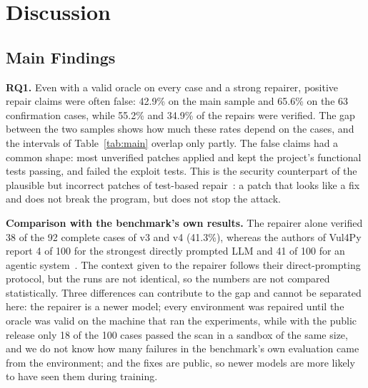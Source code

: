 \documentclass[ai,article,submit,oneauthor]{Definitions/mdpi}
\begin{document}
\section{Discussion}\label{sec:discussion}

\subsection{Main Findings}

\textbf{RQ1.} Even with a valid oracle on every case and a strong repairer, positive repair claims were often false: 42.9\% on the main sample and 65.6\% on the 63 confirmation cases, while 55.2\% and 34.9\% of the repairs were verified. The gap between the two samples shows how much these rates depend on the cases, and the intervals of Table~\ref{tab:main} overlap only partly. The false claims had a common shape: most unverified patches applied and kept the project's functional tests passing, and failed the exploit tests. This is the security counterpart of the plausible but incorrect patches of test-based repair~\cite{Qi2015AnalysisOfPatch,Smith2015IsTheCure}: a patch that looks like a fix and does not break the program, but does not stop the attack.

\textbf{Comparison with the benchmark's own results.} The repairer alone verified 38 of the 92 complete cases of v3 and v4 (41.3\%), whereas the authors of Vul4Py report 4 of 100 for the strongest directly prompted LLM and 41 of 100 for an agentic system~\cite{Bui2026Vul4pyBenchmarkingAutomated}. The context given to the repairer follows their direct-prompting protocol, but the runs are not identical, so the numbers are not compared statistically. Three differences can contribute to the gap and cannot be separated here: the repairer is a newer model; every environment was repaired until the oracle was valid on the machine that ran the experiments, while with the public release only 18 of the 100 cases passed the scan in a sandbox of the same size, and we do not know how many failures in the benchmark's own evaluation came from the environment; and the fixes are public, so newer models are more likely to have seen them during training.
\end{document}
